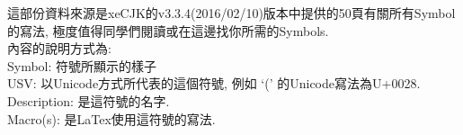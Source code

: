 
這部份資料來源是xeCJK的v3.3.4(2016/02/10)版本中提供的50頁有關所有Symbol的寫法, 極度值得同學們閱讀或在這邊找你所需的Symbols.\\

內容的說明方式為:\\
Symbol: 符號所顯示的樣子\\
USV: 以Unicode方式所代表的這個符號, 例如 `(' 的Unicode寫法為U+0028.\\
Description: 是這符號的名字.\\
Macro(s): 是LaTex使用這符號的寫法.\\



\EndChapter
